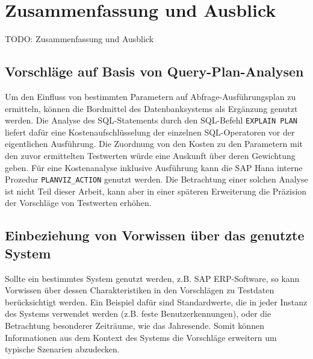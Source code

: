 \section{Zusammenfassung und Ausblick}\label{chap:conclusion}

%
%

TODO: Zusammenfassung und Ausblick


\subsection{Vorschläge auf Basis von Query-Plan-Analysen}
Um den Einfluss von bestimmten Parametern auf Abfrage-Ausführungsplan zu ermitteln, können die Bordmittel des Datenbanksystems als Ergänzung genutzt werden.
Die Analyse des SQL-Statements durch den SQL-Befehl \texttt{EXPLAIN PLAN} liefert dafür eine Kostenaufschlüsselung der einzelnen SQL-Operatoren vor der eigentlichen Ausführung.
Die Zuordnung von den Kosten zu den Parametern mit den zuvor ermittelten Testwerten würde eine Auskunft über deren Gewichtung geben.
Für eine Kostenanalyse inklusive Ausführung kann die SAP Hana interne Prozedur \texttt{PLANVIZ\_ACTION} genutzt werden.
Die Betrachtung einer solchen Analyse ist nicht Teil dieser Arbeit, kann aber in einer späteren Erweiterung die Präzision der Vorschläge von Testwerten erhöhen.

\subsection{Einbeziehung von Vorwissen über das genutzte System}
Sollte ein bestimmtes System genutzt werden, z.B. SAP ERP-Software, so kann Vorwissen über dessen Charakteristiken in den Vorschlägen zu Testdaten berücksichtigt werden.
Ein Beispiel dafür sind Standardwerte, die in jeder Instanz des Systems verwendet werden (z.B. feste Benutzerkennungen), oder die Betrachtung besonderer Zeiträume, wie das Jahresende.
Somit können Informationen aus dem Kontext des Systems die Vorschläge erweitern um typische Szenarien abzudecken.